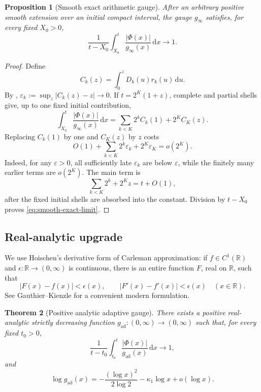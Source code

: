 \documentclass[11pt,oneside]{article}
\numberwithin{equation}{section}
\newtheorem{theorem}{Theorem}[section]
\newtheorem{proposition}[theorem]{Proposition}
\theoremstyle{definition}
\theoremstyle{remark}
\newcommand{\R}{\mathbb R}
\newcommand{\dd}{\,\mathrm d}
\newcommand{\abs}[1]{\left|#1\right|}
\newcommand{\PhiUp}{\Phi}
\newcommand{\defeq}{\mathrel{:=}}
\begin{document}
\begin{proposition}[Smooth exact arithmetic gauge]
\label{prop:smooth-adaptive}
After an arbitrary positive smooth extension over an initial compact interval, the gauge
\(g_\infty\) satisfies, for every fixed \(X_0>0\),
\begin{equation}
 \frac1{t-X_0}\int_{X_0}^{t}
 \frac{\abs{\PhiUp(x)}}{g_\infty(x)}\dd x\longrightarrow1.
 \label{eq:smooth-exact-limit}
\end{equation}
\end{proposition}

\begin{proof}
Define
\[
 C_k(z)=\int_0^zD_k(u)r_k(u)\dd u.
\]
By ,
\(
 \varepsilon_k\defeq\sup_z|C_k(z)-z|\to0
\).  If \(t=2^K(1+z)\), complete and partial shells give, up to one fixed initial
contribution,
\begin{equation}
 \int_{X_0}^{t}\frac{\abs{\PhiUp(x)}}{g_\infty(x)}\dd x
 =\sum_{k<K}2^kC_k(1)+2^KC_K(z).
 \label{eq:adaptive-shell-sum}
\end{equation}
Replacing \(C_k(1)\) by one and \(C_K(z)\) by \(z\) costs
\[
 O(1)+\sum_{k<K}2^k\varepsilon_k+2^K\varepsilon_K=o(2^K).
\]
Indeed, for any \(\varepsilon>0\), all sufficiently late \(\varepsilon_k\) are below
\(\varepsilon\), while the finitely many earlier terms are \(o(2^K)\).  The main term is
\[
 \sum_{k<K}2^k+2^Kz=t+O(1),
\]
after the fixed initial shells are absorbed into the constant.  Division by \(t-X_0\)
proves \eqref{eq:smooth-exact-limit}.
\end{proof}

\subsection{Real-analytic upgrade}

We use Hoischen's derivative form of Carleman approximation: if
\(f\in C^1(\R)\) and \(\epsilon:\R\to(0,\infty)\) is continuous, there is an entire
function \(F\), real on \(\R\), such that
\begin{equation}
 |F(x)-f(x)|<\epsilon(x),
 \qquad |F'(x)-f'(x)|<\epsilon(x)
 \quad(x\in\R).
 \label{eq:Hoischen}
\end{equation}
See Gauthier--Kienzle \cite{gauthier-kienzle} for a convenient modern formulation.

\begin{theorem}[Positive analytic adaptive gauge]
\label{thm:analytic-adaptive}
There exists a positive real-analytic strictly decreasing function
\(g_{\mathrm{ad}}:(0,\infty)\to(0,\infty)\) such that, for every fixed \(t_0>0\),
\begin{equation}
 \frac1{t-t_0}\int_{t_0}^{t}
 \frac{\abs{\PhiUp(x)}}{g_{\mathrm{ad}}(x)}\dd x\longrightarrow1,
 \label{eq:analytic-adaptive-limit}
\end{equation}
and
\begin{equation}
 \log g_{\mathrm{ad}}(x)
 =-\frac{(\log x)^2}{2\log2}-\kappa_1\log x+o(\log x).
 \label{eq:analytic-adaptive-scale}
\end{equation}
\end{theorem}
\end{document}
